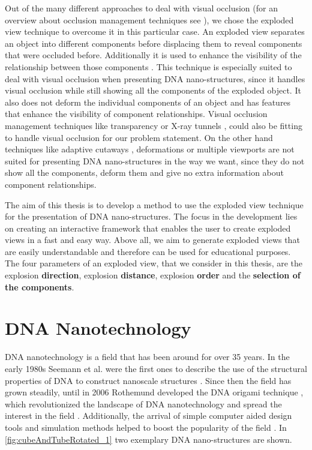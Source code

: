 \documentclass[draft,final]{vutinfth} %
\begin{document}
\par Out of the many different approaches to deal with visual occlusion (for an overview about occlusion management techniques see \cite{elmqvist2008taxonomy}), we chose the exploded view technique to overcome it in this particular case. 
An exploded view separates an object into different components before displacing them to reveal components that were occluded before.
Additionally it is used to enhance the visibility of the relationship between those components \cite{bruckner2006exploded}. 
This technique is especially suited to deal with visual occlusion when presenting DNA nano-structures, since it handles visual occlusion while still showing all the components of the exploded object. It also does not deform the individual components of an object and has features that enhance the visibility of component relationships.
Visual occlusion management techniques like transparency \cite{elmqvist2007employing} or X-ray tunnels \cite{bane2004interactive}, could also be fitting to handle visual occlusion for our problem statement. 
On the other hand techniques like adaptive cutaways \cite{burns2008adaptive}, deformations \cite{mcguffin2003using} or multiple viewports \cite{bares1998intelligent} are not suited for presenting DNA nano-structures in the way we want, since they do not show all the components, deform them and give no extra information about component relationships.

\par The aim of this thesis is to develop a method to use the exploded view technique for the presentation of DNA nano-structures. 
The focus in the development lies on creating an interactive framework that enables the user to create exploded views in a fast and easy way.
Above all, we aim to generate exploded views that are easily understandable and therefore can be used for educational purposes. 
The four parameters of an exploded view, that we consider in this thesis, are the explosion \textbf{direction}, explosion \textbf{distance}, explosion \textbf{order} and the \textbf{selection of the components}.

\section{DNA Nanotechnology}
\label{sec:mot}
DNA nanotechnology is a field that has been around for over 35 years. In the early 1980s Seemann et al. were the first ones to describe the use of the structural properties of DNA to construct nanoscale structures \cite{seeman1983design}. Since then the field has grown steadily, until in 2006 Rothemund developed the DNA origami technique \cite{rothemund2006folding}, which revolutionized the landscape of DNA nanotechnology and spread the interest in the field \cite{zhang2014structural}. Additionally, the arrival of simple computer aided design tools and simulation methods helped to boost the popularity of the field \cite{simmel2014wireframe}. In \autoref{fig:cubeAndTubeRotated_1} two exemplary DNA nano-structures are shown.
\end{document}
